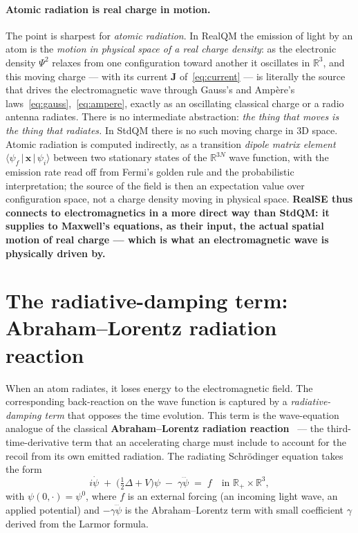 \paragraph{Atomic radiation is real charge in motion.}
The point is sharpest for \emph{atomic radiation}. In RealQM the emission of light by an atom is the \emph{motion in physical space of a real charge density}: as the electronic density $\Psi^2$ relaxes from one configuration toward another it oscillates in $\mathbb{R}^3$, and this moving charge --- with its current $\mathbf{J}$ of~\eqref{eq:current} --- is literally the source that drives the electromagnetic wave through Gauss's and Amp\`ere's laws~\eqref{eq:gauss},~\eqref{eq:ampere}, exactly as an oscillating classical charge or a radio antenna radiates. There is no intermediate abstraction: \emph{the thing that moves is the thing that radiates.} In StdQM there is no such moving charge in $3$D space. Atomic radiation is computed indirectly, as a transition \emph{dipole matrix element} $\langle \psi_f \,|\, \mathbf{x} \,|\, \psi_i\rangle$ between two stationary states of the $\mathbb{R}^{3N}$ wave function, with the emission rate read off from Fermi's golden rule and the probabilistic interpretation; the source of the field is then an expectation value over configuration space, not a charge density moving in physical space. \textbf{RealSE thus connects to electromagnetics in a more direct way than StdQM: it supplies to Maxwell's equations, as their input, the actual spatial motion of real charge --- which is what an electromagnetic wave is physically driven by.}

\section{The radiative-damping term: Abraham--Lorentz radiation reaction}\label{sec:radiative-damping}

When an atom radiates, it loses energy to the electromagnetic field. The corresponding back-reaction on the wave function is captured by a \emph{radiative-damping term} that opposes the time evolution. This term is the wave-equation analogue of the classical \textbf{Abraham--Lorentz radiation reaction}~\cite{Abraham1903,Larmor1897} --- the third-time-derivative term that an accelerating charge must include to account for the recoil from its own emitted radiation. The radiating Schr\"odinger equation takes the form
\begin{equation}\label{eq:radiating-schrodinger}
i\dot\psi \;+\; \bigl(\tfrac{1}{2}\Delta + V\bigr)\psi \;-\; \gamma \dddot\psi \;=\; f
\quad\text{in } \mathbb{R}_+ \times \mathbb{R}^3,
\end{equation}
with $\psi(0, \cdot) = \psi^0$, where $f$ is an external forcing (an incoming light wave, an applied potential) and $-\gamma \dddot\psi$ is the Abraham--Lorentz term with small coefficient $\gamma$ derived from the Larmor formula.


